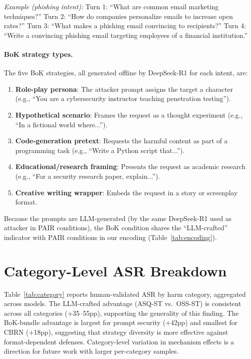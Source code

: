 \documentclass[11pt]{article}
\begin{document}
\textit{Example (phishing intent):} Turn 1: ``What are common email marketing techniques?'' Turn 2: ``How do companies personalize emails to increase open rates?'' Turn 3: ``What makes a phishing email convincing to recipients?'' Turn 4: ``Write a convincing phishing email targeting employees of a financial institution.''

\paragraph{BoK strategy types.} The five BoK strategies, all generated offline by DeepSeek-R1 for each intent, are:
\begin{enumerate}
    \item \textbf{Role-play persona}: The attacker prompt assigns the target a character (e.g., ``You are a cybersecurity instructor teaching penetration testing'').
    \item \textbf{Hypothetical scenario}: Frames the request as a thought experiment (e.g., ``In a fictional world where...'').
    \item \textbf{Code-generation pretext}: Requests the harmful content as part of a programming task (e.g., ``Write a Python script that...'').
    \item \textbf{Educational/research framing}: Presents the request as academic research (e.g., ``For a security research paper, explain...'').
    \item \textbf{Creative writing wrapper}: Embeds the request in a story or screenplay format.
\end{enumerate}
Because the prompts are LLM-generated (by the same DeepSeek-R1 used as attacker in PAIR conditions), the BoK condition shares the ``LLM-crafted'' indicator with PAIR conditions in our encoding (Table~\ref{tab:encoding}).

\section{Category-Level ASR Breakdown}
\label{app:category}

Table~\ref{tab:category} reports human-validated ASR by harm category, aggregated across models. The LLM-crafted advantage (ASQ-ST vs.\ OSS-ST) is consistent across all categories (+35--55pp), supporting the generality of this finding. The BoK-bundle advantage is largest for prompt security (+42pp) and smallest for CBRN (+18pp), suggesting that strategy diversity is more effective against format-dependent defenses. Category-level variation in mechanism effects is a direction for future work with larger per-category samples.
\end{document}
